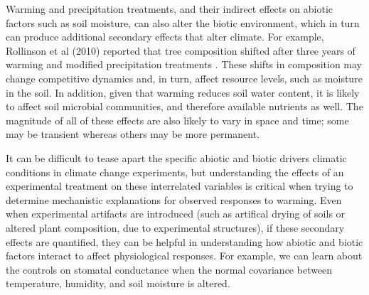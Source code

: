 \documentclass{article}
\begin{document}
\par Warming and precipitation treatments, and their indirect effects on abiotic factors such as soil moisture, can also alter the biotic environment, which in turn can produce additional secondary effects that alter climate. For example, Rollinson et al (2010) reported that tree composition shifted after three years of warming and modified precipitation treatments \citep{rollinson2012}. These shifts in composition may change competitive dynamics and, in turn, affect resource levels, such as moisture in the soil. In addition, given that warming reduces soil water content, it is likely to affect soil microbial communities, and therefore available nutrients as well. The magnitude of all of these effects are also likely to vary in space and time; some may be transient whereas others may be more permanent. 
\par It can be difficult to tease apart the specific abiotic and biotic drivers climatic conditions in climate change experiments, but understanding the effects of an experimental treatment on these interrelated variables is critical when trying to determine mechanistic explanations for observed responses to warming. Even when experimental artifacts are introduced (such as artifical drying of soils or altered plant composition, due to experimental structures), if these secondary effects are quantified, they can be helpful in understanding how abiotic and biotic factors interact to affect physiological responses. For example, we can learn about the controls on stomatal conductance when the normal covariance between temperature, humidity, and soil moisture is altered. 
\end{document}

